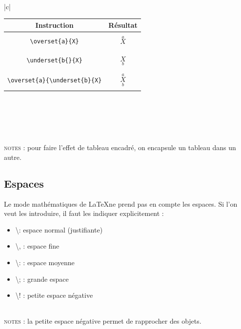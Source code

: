 \documentclass[a4paper, 10pt]{book}
\begin{document}
\begin{tabular}{|c|}
\hline \\
\begin{tabular}{|c||c|}
\hline
Instruction & Résultat \\
\hline \hline 
\\ \texttt{\textbackslash overset\{a\}\{X\}} & $ \overset{a}{X}$ \\ \\
\hline \\
\texttt{\textbackslash underset\{b\{\}\{X\}} & $ \underset{b}{X} $ \\ \\
\hline \\
\texttt{\textbackslash overset\{a\}\{\textbackslash underset\{b\}\{X\}} & $ \overset{a}{\underset{b}{X}} $\\ \\
\hline
\end{tabular}\\ \\
\hline 
\end{tabular}\\ \\

\textsc{notes :} pour faire l'effet de tableau encadré, on encapsule un tableau dans un autre.

\subsection{Espaces\\}

Le mode mathématiques de \LaTeX ne prend pas en compte les espaces. Si l'on veut les introduire, il faut les indiquer explicitement : \\

\begin{itemize}
\item \textbackslash  : espace normal (justifiante)
\item \textbackslash , : espace fine 
\item \textbackslash : : espace moyenne
\item \textbackslash ; : grande espace
\item \textbackslash ! : petite espace négative \\ \\
\end{itemize}

\textsc{notes :} la petite espace négative permet de rapprocher des objets.
\end{document}
